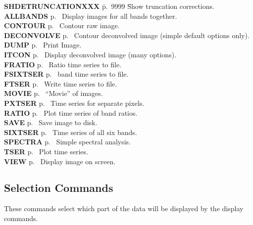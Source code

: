 \begin{tabbing}
{\bf SHDETRUNCATIONXXX} \= p.~9999 \= Show truncation corrections.\kill
{\bf ALLBANDS} \> p.~\pageref{al} \> Display images for all bands
together.\\
{\bf CONTOUR} \> p.~\pageref{con} \> Contour raw image.\\
{\bf DECONVOLVE} \> p.~\pageref{dec} \> Contour deconvolved image
(simple default options only).\\
{\bf DUMP} \> p.~\pageref{du} \> Print Image.\\
{\bf ITCON} \> p.~\pageref{it} \> Display deconvolved image (many options).\\
{\bf FRATIO} \> p.~\pageref{fr} \> Ratio time series to file.\\
{\bf FSIXTSER} \> p.~\pageref{fsi}  band time series to file.\\
{\bf FTSER} \> p.~\pageref{ft} \> Write time series to file.\\
{\bf MOVIE} \> p.~\pageref{mo} \> ``Movie'' of images.\\
{\bf PXTSER} \> p.~\pageref{px} \> Time series for separate pixels.\\
{\bf RATIO} \> p.~\pageref{ra} \> Plot time series of band ratios.\\
{\bf SAVE} \> p.~\pageref{sa} \> Save image to disk.\\
{\bf SIXTSER} \> p.~\pageref{six} \> Time series of all six bands.\\
{\bf SPECTRA} \> p.~\pageref{sp} \> Simple spectral analysis.\\
{\bf TSER} \> p.~\pageref{ts} \> Plot time series.\\
{\bf VIEW} \> p.~\pageref{vi} \> Display image on screen.\\
\end{tabbing}

\subsection{Selection Commands}

These commands select which part of the data will be displayed by the
display commands.

